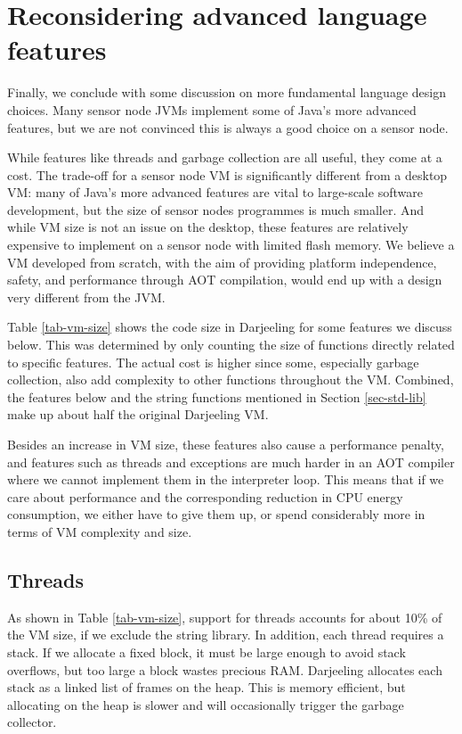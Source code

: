 \section{Reconsidering advanced language features}
\label{sec-advanced-features}
Finally, we conclude with some discussion on more fundamental language design choices. Many sensor node JVMs implement some of Java's more advanced features, but we are not convinced this is always a good choice on a sensor node.

While features like threads and garbage collection are all useful, they come at a cost. The trade-off for a sensor node VM is significantly different from a desktop VM: many of Java's more advanced features are vital to large-scale software development, but the size of sensor nodes programmes is much smaller. And while VM size is not an issue on the desktop, these features are relatively expensive to implement on a sensor node with limited flash memory. We believe a VM developed from scratch, with the aim of providing platform independence, safety, and performance through AOT compilation, would end up with a design very different from the JVM.

Table \ref{tab-vm-size} shows the code size in Darjeeling for some features we discuss below. This was determined by only counting the size of functions directly related to specific features. The actual cost is higher since some, especially garbage collection, also add complexity to other functions throughout the VM. Combined, the features below and the string functions mentioned in Section \ref{sec-std-lib} make up about half the original Darjeeling VM.

Besides an increase in VM size, these features also cause a performance penalty, and features such as threads and exceptions are much harder in an AOT compiler where we cannot implement them in the interpreter loop. This means that if we care about performance and the corresponding reduction in CPU energy consumption, we either have to give them up, or spend considerably more in terms of VM complexity and size.


\subsection{Threads}
As shown in Table \ref{tab-vm-size}, support for threads accounts for about 10\% of the VM size, if we exclude the string library. In addition, each thread requires a stack. If we allocate a fixed block, it must be large enough to avoid stack overflows, but too large a block wastes precious RAM. Darjeeling allocates each stack as a linked list of frames on the heap. This is memory efficient, but allocating on the heap is slower and will occasionally trigger the garbage collector.

